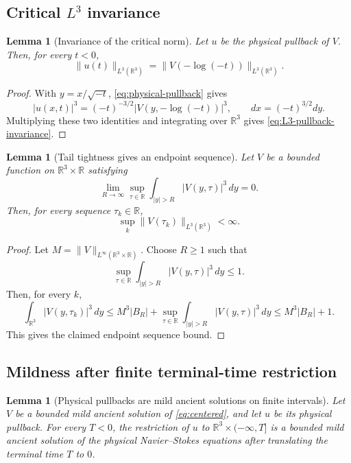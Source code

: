 \documentclass[11pt]{amsart}
\theoremstyle{plain}
\newtheorem{lemma}[theorem]{Lemma}
\theoremstyle{definition}
\theoremstyle{remark}
\numberwithin{equation}{section}
\newcommand{\R}{\mathbb R}
\begin{document}
\subsection{\texorpdfstring{Critical \(L^3\) invariance}{Critical L3 invariance}}

\begin{lemma}[Invariance of the critical norm]
\label{lem:L3-pullback-invariance}
Let \(u\) be the physical pullback of \(V\).  Then, for every \(t<0\),
\begin{equation}\label{eq:L3-pullback-invariance}
   \|u(t)\|_{L^3(\R^3)}
   =
   \|V(-\log(-t))\|_{L^3(\R^3)} .
\end{equation}
\end{lemma}

\begin{proof}
With \(y=x/\sqrt{-t}\), \eqref{eq:physical-pullback} gives
\[
   |u(x,t)|^3=(-t)^{-3/2}|V(y,-\log(-t))|^3,
   \qquad
   dx=(-t)^{3/2}dy .
\]
Multiplying these two identities and integrating over \(\R^3\) gives
\eqref{eq:L3-pullback-invariance}.
\end{proof}

\begin{lemma}[Tail tightness gives an endpoint sequence]
\label{lem:tail-tight-sequence-L3}
Let \(V\) be a bounded function on \(\R^3\times\R\) satisfying
\[
   \lim_{R\to\infty}
   \sup_{\tau\in\R}\int_{|y|>R}|V(y,\tau)|^3\,dy=0 .
\]
Then, for every sequence \(\tau_k\in\R\),
\[
   \sup_k\|V(\tau_k)\|_{L^3(\R^3)}<\infty .
\]
\end{lemma}

\begin{proof}
Let \(M=\|V\|_{L^\infty(\R^3\times\R)}\).  Choose \(R\ge1\) such that
\[
   \sup_{\tau\in\R}\int_{|y|>R}|V(y,\tau)|^3\,dy\le1 .
\]
Then, for every \(k\),
\[
   \int_{\R^3}|V(y,\tau_k)|^3\,dy
   \le M^3 |B_R|
      + \sup_{\tau\in\R}\int_{|y|>R}|V(y,\tau)|^3\,dy
   \le M^3|B_R|+1 .
\]
This gives the claimed endpoint sequence bound.
\end{proof}

\subsection{Mildness after finite terminal-time restriction}

\begin{lemma}[Physical pullbacks are mild ancient solutions on finite intervals]
\label{lem:physical-mild}
Let \(V\) be a bounded mild ancient solution of \eqref{eq:centered}, and let
\(u\) be its physical pullback.  For every \(T<0\), the restriction of \(u\)
to \(\R^3\times(-\infty,T]\) is a bounded mild ancient solution of the
physical Navier--Stokes equations after translating the terminal time \(T\) to
\(0\).
\end{lemma}
\end{document}
